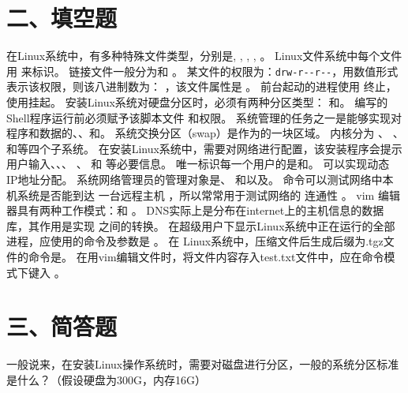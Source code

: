 \documentclass[addpoints,12pt,answers]{exam}
\begin{document}
\begin{CJK*}{UTF8}{gbsn}
\begin{questions}
\end{questions}

\section*{二、填空题}

\begin{questions}
	\question[5] 在Linux系统中，有多种特殊文件类型，分别是\fillin[], \fillin[], \fillin[], \fillin[], \fillin[]。
	\question[1] Linux文件系统中每个文件用 \fillin[]来标识。
	\question[2] 链接文件一般分为\fillin[] 和 \fillin[]。
	\question[2] 某文件的权限为：\lstinline{drw-r--r--}，用数值形式表示该权限，则该八进制数为： \fillin[]，该文件属性是 \fillin[]。
	\question[2] 前台起动的进程使用 \fillin[]终止，使用\fillin[]挂起。
	\question[2] 安装Linux系统对硬盘分区时，必须有两种分区类型： \fillin[] 和\fillin[] 。
	\question[2] 编写的Shell程序运行前必须赋予该脚本文件 \fillin[]和\fillin[]权限。
	\question[4] 系统管理的任务之一是能够实现对程序和数据的\fillin[]、\fillin[]、\fillin[]和\fillin[]。
	\question[2] 系统交换分区（swap）是作为\fillin[]的一块区域。
	\question[4] 内核分为 \fillin[][2in]、 \fillin[][2in]、\fillin[][2in] 和\fillin[][2in] 等四个子系统。
	\question[6] 在安装Linux系统中，需要对网络进行配置，该安装程序会提示用户输入\fillin[]、\fillin[]、\fillin[]、
		\fillin[]、 \fillin[] 和 \fillin[] 等必要信息。
	\question[2] 唯一标识每一个用户的是\fillin[]和\fillin[]。
 	\question[1] \fillin[][2in]可以实现动态 IP地址分配。
	\question[4] 系统网络管理员的管理对象是\fillin[]、 \fillin[] 和\fillin[]以及\fillin[]。
	\question[1] \fillin[]命令可以测试网络中本机系统是否能到达 一台远程主机 ，所以常常用于测试网络的 连通性 。
	\question[2] vim 编辑器具有两种工作模式：\fillin[] 和 \fillin[]。
	\question[1] DNS实际上是分布在internet上的主机信息的数据库，其作用是实现 \fillin[][2in]之间的转换。
	\question[1] 在超级用户下显示Linux系统中正在运行的全部进程，应使用的命令及参数是 \fillin[]。
	\question[1] 在 Linux系统中，压缩文件后生成后缀为.tgz文件的命令是\fillin[]。
	\question[1] 在用vim编辑文件时，将文件内容存入test.txt文件中，应在命令模式下键入 \fillin[]。
\end{questions}

\section*{三、简答题}

\begin{questions}

\question[5]
一般说来，在安装Linux操作系统时，需要对磁盘进行分区，一般的系统分区标准是什么？（假设硬盘为300G，内存16G）
\begin{solution}
\vspace{2in}
\end{solution}
\vspace{2in}


\end{questions}
\end{CJK*}
\end{document}
